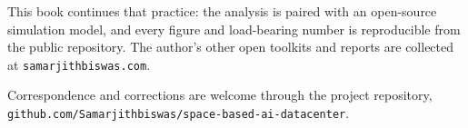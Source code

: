 \documentclass[
  11pt,
  openany,
  oneside]{book}
\begin{document}
\vspace{8pt}
\noindent This book continues that practice: the analysis is paired with an open-source simulation
model, and every figure and load-bearing number is reproducible from the public repository. The
author's other open toolkits and reports are collected at \texttt{samarjithbiswas.com}.

\vspace{8pt}
\noindent Correspondence and corrections are welcome through the project repository,
\texttt{github.com/Samarjithbiswas/space-based-ai-datacenter}.

\cleardoublepage
{}
\printindex
\end{document}
